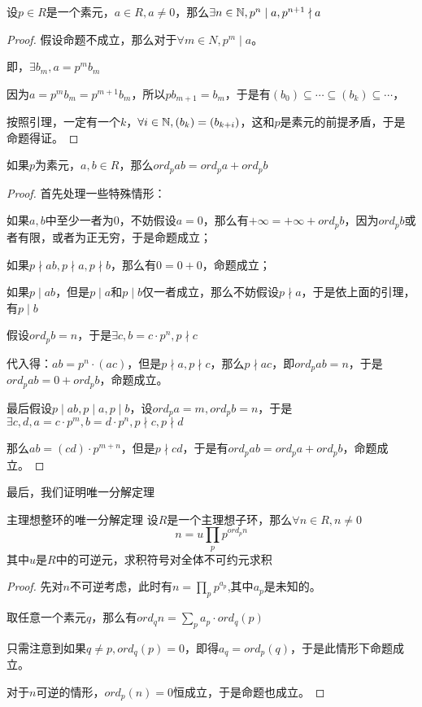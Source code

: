 \documentclass[12pt, a4paper, oneside, UTF8]{ctexbook}
\begin{document}
			\begin{lemma}{}{}
				设$p \in R$是一个素元，$a \in R,a \neq 0$，那么$\exists n \in \mathbb{N},p^n \mid a,p^{n+1}\nmid a$
			\end{lemma}
			\begin{proof}
				假设命题不成立，那么对于$\forall m \in N,p^m \mid a$。
				
				即，$\exists b_m,a = p^m b_m$
				
				因为$a = p^m b_m=p^{m+1} b_m$，所以$p b_{m+1} = b_m$，于是有$(b_0) \subseteq \cdots \subseteq (b_k) \subseteq \cdots$，
				
				按照引理，一定有一个$k$，$\forall i \in \mathbb{N},(b_k)=(b_{k+i})$，这和$p$是素元的前提矛盾，于是命题得证。
			\end{proof}
				\begin{lemma}{}{}
				如果$p$为素元，$a,b\in R$，那么$ord_p ab=ord_p a + ord_p b$
			\end{lemma}
			\begin{proof}
				首先处理一些特殊情形：
				
				如果$a,b$中至少一者为$0$，不妨假设$a=0$，那么有$+\infty = +\infty + ord_p b$，因为$ord_p b$或者有限，或者为正无穷，于是命题成立；
				
				如果$p \nmid ab,p\nmid a,p\nmid b$，那么有$0=0+0$，命题成立；
				
				如果$p \mid ab$，但是$p \mid a$和$p \mid b$仅一者成立，那么不妨假设$p \nmid a$，于是依上面的引理，有$p \mid b$
				
				假设$ord_p b = n$，于是$\exists c,b=c\cdot p^n,p \nmid c$
				
				代入得：$ab=p^n\cdot (ac)$，但是$p \nmid a,p\nmid c$，那么$p \nmid ac$，即$ord_p ab=n$，于是$ord_p ab = 0+ ord_p b$，命题成立。
				
				最后假设$p \mid ab,p \mid a,p \mid b$，设$ord_p a = m,ord_p b = n$，于是$\exists c,d,a = c\cdot p^m,b=d\cdot p^n,p \nmid c,p\nmid d$
				
				那么$ab=(cd)\cdot p^{m+n}$，但是$p \nmid cd$，于是有$ord_p ab=ord_p a + ord_p b$，命题成立。
			\end{proof}
			最后，我们证明唯一分解定理
			\begin{them}{主理想整环的唯一分解定理}{}
				设$R$是一个主理想子环，那么$\forall n \in R,n \neq 0$
				\begin{equation}
					n = u \prod_{p} p^{ord_p n}
				\end{equation}
				其中$u$是$R$中的可逆元，求积符号对全体不可约元求积
			\end{them}
			\begin{proof}
				先对$n$不可逆考虑，此时有$n=\prod_{p} p^{a_p}$,其中$a_p$是未知的。
				
				取任意一个素元$q$，那么有$ord_q n=\sum\limits_{p} a_p\cdot ord_q (p)$
				
				只需注意到如果$q \neq p,ord_q (p)=0$，即得$a_q = ord_p (q)$，于是此情形下命题成立。
				
				对于$n$可逆的情形，$ord_p (n)=0$恒成立，于是命题也成立。
			\end{proof}
\ifx\allfiles\undefined
\end{document}
